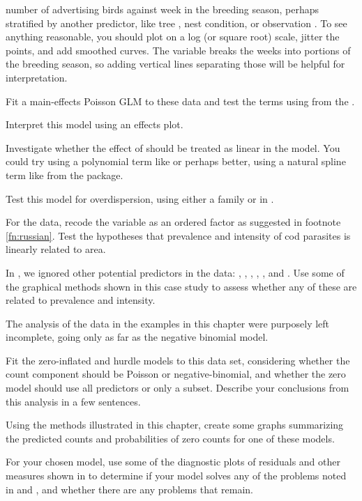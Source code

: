 \documentclass[11pt]{report}\usepackage[]{graphicx}\usepackage[]{color}
\begin{document}
\begin{Exercises}
\begin{enumerate*}
		number of advertising birds against week in the breeding season, perhaps stratified
		by another predictor, like tree , nest condition, or observation
		. 
		To see anything reasonable,
		you should plot  on a log (or square root) scale, jitter the points, and add
		smoothed curves. The variable  breaks the weeks into portions of the
		breeding season, so adding vertical lines separating those will be helpful for interpretation.
		\item Fit a main-effects Poisson GLM to these data and test the terms using
		 from the .
		\item Interpret this model using an effects plot.
		\item Investigate whether the effect of  should be treated as linear in the
		model.  You could try using a polynomial term like  or
		perhaps better, using a natural spline term like  from the  package.
    \item \begin{sloppypar} Test this model for overdispersion, using either a  family or
     in . \end{sloppypar}
	\end{enumerate*}		

  \exercise For the  data, recode the  variable as an ordered factor as suggested in
  footnote \ref{fn:russian}.  Test the hypotheses that prevalence and intensity of cod parasites is linearly
  related to area.

  \exercise In , we ignored other potential predictors in the  data:
  , , , , , and .
  Use some of the graphical methods shown in this case study to assess whether any of these are related
  to prevalence and intensity.

  \exercise The analysis of the  data in the examples in this chapter were purposely left incomplete,
  going only as far as the negative binomial model.
  \begin{enumerate*}
    \item Fit the zero-inflated and hurdle models to this data set, considering whether the count component should
    be Poisson or negative-binomial, and whether the zero model should use all predictors or only a subset.
    Describe your conclusions from this analysis in a few sentences.
    \item Using the methods illustrated in this chapter, create some graphs summarizing the predicted counts
    and probabilities of zero counts for one of these models.
    \item For your chosen model, use some of the diagnostic plots of residuals and other measures shown in
     to determine if your model solves any of the problems noted in 
    and , and whether there are any problems that remain.
  \end{enumerate*}


\end{Exercises}
\end{document}
